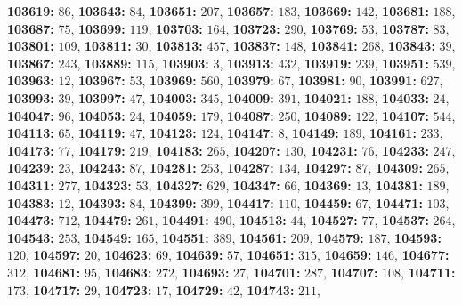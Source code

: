 \textsf{\bfseries 103619:} $86$, \textsf{\bfseries 103643:} $84$, \textsf{\bfseries 103651:} $207$, \textsf{\bfseries 103657:} $183$, \textsf{\bfseries 103669:} $142$, \textsf{\bfseries 103681:} $188$, \textsf{\bfseries 103687:} $75$, \textsf{\bfseries 103699:} $119$, \textsf{\bfseries 103703:} $164$, \textsf{\bfseries 103723:} $290$, \textsf{\bfseries 103769:} $53$, \textsf{\bfseries 103787:} $83$, \textsf{\bfseries 103801:} $109$, \textsf{\bfseries 103811:} $30$, \textsf{\bfseries 103813:} $457$, \textsf{\bfseries 103837:} $148$, \textsf{\bfseries 103841:} $268$, \textsf{\bfseries 103843:} $39$, \textsf{\bfseries 103867:} $243$, \textsf{\bfseries 103889:} $115$, \textsf{\bfseries 103903:} $3$, \textsf{\bfseries 103913:} $432$, \textsf{\bfseries 103919:} $239$, \textsf{\bfseries 103951:} $539$, \textsf{\bfseries 103963:} $12$, \textsf{\bfseries 103967:} $53$, \textsf{\bfseries 103969:} $560$, \textsf{\bfseries 103979:} $67$, \textsf{\bfseries 103981:} $90$, \textsf{\bfseries 103991:} $627$, \textsf{\bfseries 103993:} $39$, \textsf{\bfseries 103997:} $47$, \textsf{\bfseries 104003:} $345$, \textsf{\bfseries 104009:} $391$, \textsf{\bfseries 104021:} $188$, \textsf{\bfseries 104033:} $24$, \textsf{\bfseries 104047:} $96$, \textsf{\bfseries 104053:} $24$, \textsf{\bfseries 104059:} $179$, \textsf{\bfseries 104087:} $250$, \textsf{\bfseries 104089:} $122$, \textsf{\bfseries 104107:} $544$, \textsf{\bfseries 104113:} $65$, \textsf{\bfseries 104119:} $47$, \textsf{\bfseries 104123:} $124$, \textsf{\bfseries 104147:} $8$, \textsf{\bfseries 104149:} $189$, \textsf{\bfseries 104161:} $233$, \textsf{\bfseries 104173:} $77$, \textsf{\bfseries 104179:} $219$, \textsf{\bfseries 104183:} $265$, \textsf{\bfseries 104207:} $130$, \textsf{\bfseries 104231:} $76$, \textsf{\bfseries 104233:} $247$, \textsf{\bfseries 104239:} $23$, \textsf{\bfseries 104243:} $87$, \textsf{\bfseries 104281:} $253$, \textsf{\bfseries 104287:} $134$, \textsf{\bfseries 104297:} $87$, \textsf{\bfseries 104309:} $265$, \textsf{\bfseries 104311:} $277$, \textsf{\bfseries 104323:} $53$, \textsf{\bfseries 104327:} $629$, \textsf{\bfseries 104347:} $66$, \textsf{\bfseries 104369:} $13$, \textsf{\bfseries 104381:} $189$, \textsf{\bfseries 104383:} $12$, \textsf{\bfseries 104393:} $84$, \textsf{\bfseries 104399:} $399$, \textsf{\bfseries 104417:} $110$, \textsf{\bfseries 104459:} $67$, \textsf{\bfseries 104471:} $103$, \textsf{\bfseries 104473:} $712$, \textsf{\bfseries 104479:} $261$, \textsf{\bfseries 104491:} $490$, \textsf{\bfseries 104513:} $44$, \textsf{\bfseries 104527:} $77$, \textsf{\bfseries 104537:} $264$, \textsf{\bfseries 104543:} $253$, \textsf{\bfseries 104549:} $165$, \textsf{\bfseries 104551:} $389$, \textsf{\bfseries 104561:} $209$, \textsf{\bfseries 104579:} $187$, \textsf{\bfseries 104593:} $120$, \textsf{\bfseries 104597:} $20$, \textsf{\bfseries 104623:} $69$, \textsf{\bfseries 104639:} $57$, \textsf{\bfseries 104651:} $315$, \textsf{\bfseries 104659:} $146$, \textsf{\bfseries 104677:} $312$, \textsf{\bfseries 104681:} $95$, \textsf{\bfseries 104683:} $272$, \textsf{\bfseries 104693:} $27$, \textsf{\bfseries 104701:} $287$, \textsf{\bfseries 104707:} $108$, \textsf{\bfseries 104711:} $173$, \textsf{\bfseries 104717:} $29$, \textsf{\bfseries 104723:} $17$, \textsf{\bfseries 104729:} $42$, \textsf{\bfseries 104743:} $211$, 
